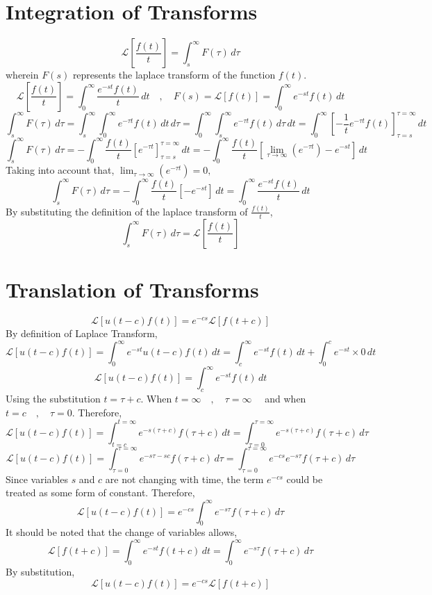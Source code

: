 \section{Integration of Transforms}
\begin{comment}
\end{comment}
$$\mathcal{L}\left[\frac{f(t)}{t}\right] = \int^{\infty}_{s}F(\tau)\,d\tau$$
wherein $F(s)$ represents the laplace transform of the function $f(t)$.
$$\mathcal{L}\left[\frac{f(t)}{t}\right] = \int^{\infty}_{0}\frac{e^{-st}f(t)}{t}\,dt\quad,\quad F(s) = \mathcal{L}[f(t)] = \int^{\infty}_{0}e^{-st}f(t)\,dt$$
$$\int^{\infty}_{s}F(\tau)\,d\tau = \int^{\infty}_{s}\int^{\infty}_{0}e^{-\tau t}f(t)\,dt\,d\tau = \int^{\infty}_{0}\int^{\infty}_{s}e^{-\tau t}f(t)\,d\tau\,dt = \int^{\infty}_{0}\left[-\frac{1}{t}e^{-\tau t}f(t)\right]^{\tau = \infty}_{\tau = s}\,dt$$
$$\int^{\infty}_{s}F(\tau)\,d\tau = -\int^{\infty}_{0}\frac{f(t)}{t}\left[e^{-\tau t}\right]^{\tau = \infty}_{\tau = s}\,dt = -\int^{\infty}_{0}\frac{f(t)}{t}\left[\lim_{\tau\to\infty}(e^{-\tau t}) - e^{-s t}\right]\,dt$$
Taking into account that, $\displaystyle{\lim_{\tau\to\infty}(e^{-\tau t})} = 0,$
$$\int^{\infty}_{s}F(\tau)\,d\tau = -\int^{\infty}_{0}\frac{f(t)}{t}\left[- e^{-s t}\right]\,dt = \int^{\infty}_{0}\frac{e^{-s t}f(t)}{t}\,dt$$
By substituting the definition of the laplace transform of $\displaystyle{\frac{f(t)}{t}}$,
$$\int^{\infty}_{s}F(\tau)\,d\tau = \mathcal{L}\left[\frac{f(t)}{t}\right]$$
\section{Translation of Transforms}
\begin{comment}
\end{comment}
$$\mathcal{L}\left[u(t-c)f(t)\right] = e^{-cs}\mathcal{L}\left[f(t+c)\right]$$
By definition of Laplace Transform,
$$\mathcal{L}\left[u(t-c)f(t)\right] = \int^{\infty}_{0}e^{-st}u(t-c)f(t)\,dt = \int^{\infty}_{c}e^{-st}f(t)\,dt + \int^{c}_{0}e^{-st}\times0\,dt$$
$$\mathcal{L}\left[u(t-c)f(t)\right] = \int^{\infty}_{c}e^{-st}f(t)\,dt$$
Using the substitution $\displaystyle{t = \tau + c}$. When $\displaystyle{t = \infty\quad,\quad \tau = \infty \quad}$ and when $\displaystyle{t = c\quad,\quad \tau = 0}$. Therefore,
$$\mathcal{L}\left[u(t-c)f(t)\right] = \int^{t = \infty}_{t = c}e^{-s(\tau + c)}f(\tau + c)\,dt = \int^{\tau = \infty}_{\tau = 0}e^{-s(\tau + c)}f(\tau + c)\,d\tau$$
$$\mathcal{L}\left[u(t-c)f(t)\right] = \int^{\tau = \infty}_{\tau = 0}e^{-s\tau -sc}f(\tau + c)\,d\tau = \int^{\tau = \infty}_{\tau = 0}e^{-cs}e^{-s\tau}f(\tau + c)\,d\tau$$
Since variables $s$ and $c$ are not changing with time, the term $e^{-cs}$ could be treated as some form of constant. Therefore,
$$\mathcal{L}\left[u(t-c)f(t)\right] = e^{-cs}\int^{\infty}_{0}e^{-s\tau}f(\tau + c)\,d\tau$$
It should be noted that the change of variables allows,
$$\mathcal{L}\left[f(t+c)\right] = \int^{\infty}_{0}e^{-st}f(t + c)\,dt = \int^{\infty}_{0}e^{-s\tau}f(\tau + c)\,d\tau$$
By substitution,
$$\mathcal{L}\left[u(t-c)f(t)\right] = e^{-cs}\mathcal{L}\left[f(t+c)\right]$$
